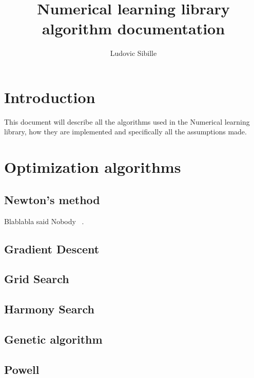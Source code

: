 \documentclass[12pt,a4paper,article]{memoir} %
\title{Numerical learning library algorithm documentation}
\author{Ludovic Sibille}
\begin{document}
\maketitle
\newpage
\tableofcontents* %
\newpage

\chapter{Introduction}
This document will describe all the algorithms used in the Numerical learning library, how they are implemented and specifically all the assumptions made.

\chapter{Optimization algorithms}
\section{Newton's method}
Blablabla said Nobody ~\cite{Nobody06}.


\section{Gradient Descent}
\section{Grid Search}
\section{Harmony Search}
\section{Genetic algorithm}
\section{Powell}



\end{document}
